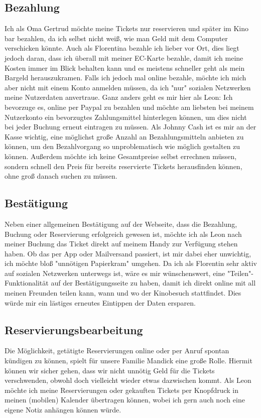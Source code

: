 \subsection{Bezahlung}
Ich als Oma Gertrud möchte meine Tickets nur reservieren und später im Kino bar bezahlen, da ich selbst nicht weiß, wie man Geld mit dem Computer verschicken könnte. Auch als Florentina bezahle ich lieber vor Ort, dies liegt jedoch daran, dass ich überall mit meiner EC-Karte bezahle, damit ich meine Kosten immer im Blick behalten kann und es meistens schneller geht als mein Bargeld herauszukramen. Falls ich jedoch mal online bezahle, möchte ich mich aber nicht mit einem Konto anmelden müssen, da ich "nur" sozialen Netzwerken meine Nutzerdaten anvertraue. Ganz anders geht es mir hier als Leon: Ich bevorzuge es, online per Paypal zu bezahlen und möchte am liebsten bei meinem Nutzerkonto ein bevorzugtes Zahlungsmittel hinterlegen können, um dies nicht bei jeder Buchung erneut eintragen zu müssen. Als Johnny Cash ist es mir an der Kasse wichtig, eine möglichst große Anzahl an Bezahlungsmitteln anbieten zu können, um den Bezahlvorgang so unproblematisch wie möglich gestalten zu können. Außerdem möchte ich keine Gesamtpreise selbst errechnen müssen, sondern schnell den Preis für bereits reservierte Tickets herausfinden können, ohne groß danach suchen zu müssen.

\subsection{Bestätigung}
Neben einer allgemeinen Bestätigung auf der Webseite, dass die Bezahlung, Buchung oder Reservierung erfolgreich gewesen ist, möchte ich als Leon nach meiner Buchung das Ticket direkt auf meinem Handy zur Verfügung stehen haben. Ob das per App oder Mailversand passiert, ist mir dabei eher unwichtig, ich möchte bloß "unnötigen Papierkram" umgehen. Da ich als Florentin sehr aktiv auf sozialen Netzwerken unterwegs ist, wäre es mir wünschenswert, eine "Teilen"-Funktionalität auf der Bestätigungsseite zu haben, damit ich direkt online mit all meinen Freunden teilen kann, wann und wo der Kinobesuch stattfindet. Dies würde mir ein lästiges erneutes Eintippen der Daten ersparen.

\subsection{Reservierungsbearbeitung}
Die Möglichkeit, getätigte Reservierungen online oder per Anruf spontan kündigen zu können, spielt für unsere Familie Mandick eine große Rolle. Hiermit können wir sicher gehen, dass wir nicht unnötig Geld für die Tickets verschwenden, obwohl doch vielleicht wieder etwas dazwischen kommt. Als Leon möchte ich meine Reservierungen oder gekauften Tickets per Knopfdruck in meinen (mobilen) Kalender übertragen können, wobei ich gern auch noch eine eigene Notiz anhängen können würde. 

